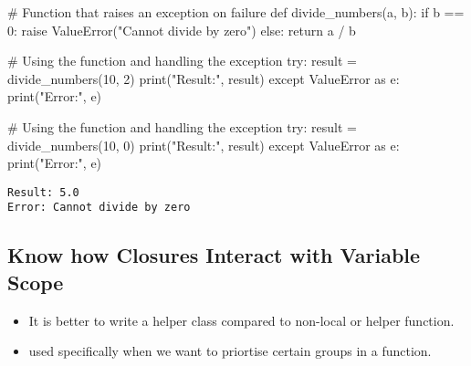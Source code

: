 \documentclass[
]{report}
\newenvironment{Shaded}{\begin{snugshade}}{\end{snugshade}}
\newcommand{\BuiltInTok}[1]{\textcolor[rgb]{0.00,0.23,0.31}{#1}}
\newcommand{\CommentTok}[1]{\textcolor[rgb]{0.37,0.37,0.37}{#1}}
\newcommand{\ControlFlowTok}[1]{\textcolor[rgb]{0.00,0.23,0.31}{#1}}
\newcommand{\DecValTok}[1]{\textcolor[rgb]{0.68,0.00,0.00}{#1}}
\newcommand{\ImportTok}[1]{\textcolor[rgb]{0.00,0.46,0.62}{#1}}
\newcommand{\KeywordTok}[1]{\textcolor[rgb]{0.00,0.23,0.31}{#1}}
\newcommand{\NormalTok}[1]{\textcolor[rgb]{0.00,0.23,0.31}{#1}}
\newcommand{\OperatorTok}[1]{\textcolor[rgb]{0.37,0.37,0.37}{#1}}
\newcommand{\PreprocessorTok}[1]{\textcolor[rgb]{0.68,0.00,0.00}{#1}}
\newcommand{\StringTok}[1]{\textcolor[rgb]{0.13,0.47,0.30}{#1}}
\providecommand{\tightlist}{%
  \setlength{\itemsep}{0pt}\setlength{\parskip}{0pt}}\usepackage{longtable,booktabs,array}
\begin{document}
\begin{Shaded}
\begin{Highlighting}[]
\CommentTok{\# Function that raises an exception on failure}
\KeywordTok{def}\NormalTok{ divide\_numbers(a, b):}
    \ControlFlowTok{if}\NormalTok{ b }\OperatorTok{==} \DecValTok{0}\NormalTok{:}
        \ControlFlowTok{raise} \PreprocessorTok{ValueError}\NormalTok{(}\StringTok{"Cannot divide by zero"}\NormalTok{)}
    \ControlFlowTok{else}\NormalTok{:}
        \ControlFlowTok{return}\NormalTok{ a }\OperatorTok{/}\NormalTok{ b}

\CommentTok{\# Using the function and handling the exception}
\ControlFlowTok{try}\NormalTok{:}
\NormalTok{    result }\OperatorTok{=}\NormalTok{ divide\_numbers(}\DecValTok{10}\NormalTok{, }\DecValTok{2}\NormalTok{)}
    \BuiltInTok{print}\NormalTok{(}\StringTok{"Result:"}\NormalTok{, result)}
\ControlFlowTok{except} \PreprocessorTok{ValueError} \ImportTok{as}\NormalTok{ e:}
    \BuiltInTok{print}\NormalTok{(}\StringTok{"Error:"}\NormalTok{, e)}

\CommentTok{\# Using the function and handling the exception}
\ControlFlowTok{try}\NormalTok{:}
\NormalTok{    result }\OperatorTok{=}\NormalTok{ divide\_numbers(}\DecValTok{10}\NormalTok{, }\DecValTok{0}\NormalTok{)}
    \BuiltInTok{print}\NormalTok{(}\StringTok{"Result:"}\NormalTok{, result)}
\ControlFlowTok{except} \PreprocessorTok{ValueError} \ImportTok{as}\NormalTok{ e:}
    \BuiltInTok{print}\NormalTok{(}\StringTok{"Error:"}\NormalTok{, e)}
\end{Highlighting}
\end{Shaded}

\begin{verbatim}
Result: 5.0
Error: Cannot divide by zero
\end{verbatim}

\hypertarget{know-how-closures-interact-with-variable-scope}{%
\subsection{Know how Closures Interact with Variable
Scope}\label{know-how-closures-interact-with-variable-scope}}

\begin{itemize}
\tightlist
\item
  It is better to write a helper class compared to non-local or helper
  function.
\item
  used specifically when we want to priortise certain groups in a
  function.
\end{itemize}
\end{document}
